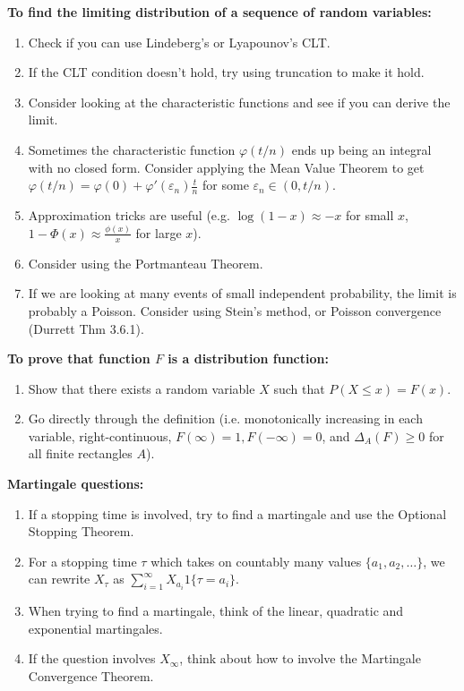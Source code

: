 \documentclass[twoside]{article}
\newcommand{\dis}{\displaystyle}
\newcommand\Dlt{\Delta}
\def\eps{\varepsilon}
\begin{document}
\textbf{To find the limiting distribution of a sequence of random variables:}
\begin{enumerate}
\item Check if you can use Lindeberg's or Lyapounov's CLT.

\item If the CLT condition doesn't hold, try using truncation to make it hold.

\item Consider looking at the characteristic functions and see if you can derive the limit.

\item Sometimes the characteristic function $\varphi(t/n)$ ends up being an integral with no closed form. Consider applying the Mean Value Theorem to get $\varphi(t/n) = \varphi(0) + \varphi'(\eps_n) \displaystyle\frac{t}{n}$ for some $\eps_n \in (0, t/n)$.

\item Approximation tricks are useful (e.g. $\log (1-x) \approx -x$ for small $x$, $1 - \Phi(x) \approx \displaystyle\frac{\phi(x)}{x}$ for large $x$).

\item Consider using the Portmanteau Theorem.

\item If we are looking at many events of small independent probability, the limit is probably a Poisson. Consider using Stein's method, or Poisson convergence (Durrett Thm 3.6.1).
\end{enumerate}

\textbf{To prove that function $F$ is a distribution function:}
\begin{enumerate}
\item Show that there exists a random variable $X$ such that $P(X \leq x) = F(x)$.

\item Go directly through the definition (i.e. monotonically increasing in each variable, right-continuous, $F(\infty) = 1, F(-\infty) = 0$, and $\Dlt_A(F) \geq 0$ for all finite rectangles $A$).
\end{enumerate}

\textbf{Martingale questions:}
\begin{enumerate}
\item If a stopping time is involved, try to find a martingale and use the Optional Stopping Theorem.

\item For a stopping time $\tau$ which takes on countably many values $\{ a_1, a_2, \dots \}$, we can rewrite $X_\tau$ as $\dis\sum_{i=1}^\infty X_{a_i} 1\{ \tau = a_i\}$.

\item When trying to find a martingale, think of the linear, quadratic and exponential martingales.

\item If the question involves $X_\infty$, think about how to involve the Martingale Convergence Theorem.
\end{enumerate}
\end{document}
